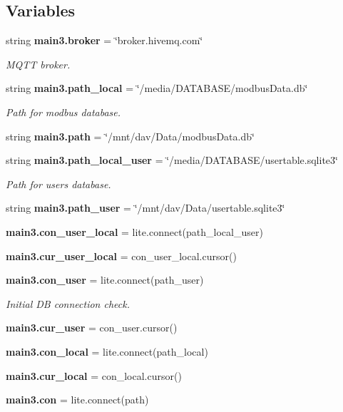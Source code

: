 \subsection*{Variables}
\begin{DoxyCompactItemize}
\item 
string \textbf{ main3.\+broker} = \char`\"{}broker.\+hivemq.\+com\char`\"{}
\begin{DoxyCompactList}\small\item\em M\+Q\+TT broker. \end{DoxyCompactList}\item 
string \textbf{ main3.\+path\+\_\+local} = \char`\"{}/media/D\+A\+T\+A\+B\+A\+SE/modbus\+Data.\+db\char`\"{}
\begin{DoxyCompactList}\small\item\em Path for modbus database. \end{DoxyCompactList}\item 
string \textbf{ main3.\+path} = \char`\"{}/mnt/dav/Data/modbus\+Data.\+db\char`\"{}
\item 
string \textbf{ main3.\+path\+\_\+local\+\_\+user} = \char`\"{}/media/D\+A\+T\+A\+B\+A\+SE/usertable.\+sqlite3\char`\"{}
\begin{DoxyCompactList}\small\item\em Path for users database. \end{DoxyCompactList}\item 
string \textbf{ main3.\+path\+\_\+user} = \char`\"{}/mnt/dav/Data/usertable.\+sqlite3\char`\"{}
\item 
\textbf{ main3.\+con\+\_\+user\+\_\+local} = lite.\+connect(path\+\_\+local\+\_\+user)
\item 
\textbf{ main3.\+cur\+\_\+user\+\_\+local} = con\+\_\+user\+\_\+local.\+cursor()
\item 
\textbf{ main3.\+con\+\_\+user} = lite.\+connect(path\+\_\+user)
\begin{DoxyCompactList}\small\item\em Initial DB connection check. \end{DoxyCompactList}\item 
\textbf{ main3.\+cur\+\_\+user} = con\+\_\+user.\+cursor()
\item 
\textbf{ main3.\+con\+\_\+local} = lite.\+connect(path\+\_\+local)
\item 
\textbf{ main3.\+cur\+\_\+local} = con\+\_\+local.\+cursor()
\item 
\textbf{ main3.\+con} = lite.\+connect(path)
\item 

\end{DoxyCompactItemize}
